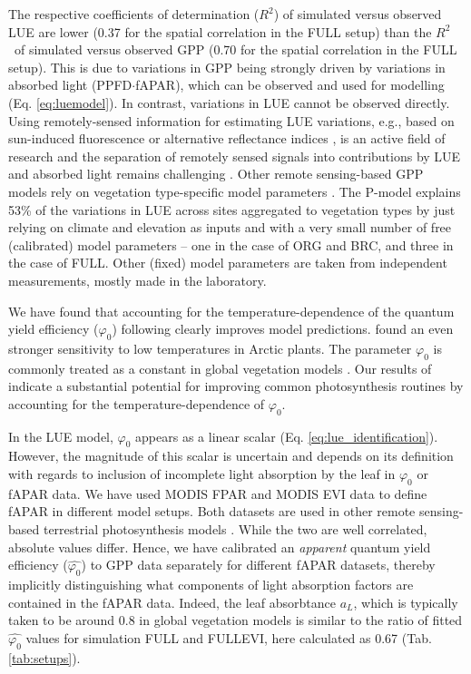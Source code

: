 \documentclass{myreport}
\newcommand{\rsq}{$R^2$}
\begin{document}
The respective coefficients of determination (\rsq ) of simulated versus observed LUE are lower (0.37 for the spatial correlation in the FULL setup) than the \rsq\ of simulated versus observed GPP (0.70 for the spatial correlation in the FULL setup). This is due to variations in GPP being strongly driven by variations in absorbed light (PPFD$\cdot$fAPAR), which can be observed and used for modelling (Eq. \ref{eq:luemodel}). In contrast, variations in LUE cannot be observed directly. Using remotely-sensed information for estimating LUE variations, e.g., based on sun-induced fluorescence \citep{frankenberg18, li18gcb, ryu19rse} or alternative reflectance indices \citep{gamon92, gamon16pnas, Badgley2017-tw}, is an active field of research and the separation of remotely sensed signals into contributions by LUE and absorbed light remains challenging \citep{porcarcastell14, ryu19rse}. Other remote sensing-based GPP models rely on vegetation type-specific model parameters \citep{Zhang2017-yr, running04, jiang16rse}. The P-model explains 53\% of the variations in LUE across sites aggregated to vegetation types by just relying on climate and elevation as inputs and with a very small number of free (calibrated) model parameters -- one in the case of ORG and BRC, and three in the case of FULL. Other (fixed) model parameters are taken from independent measurements, mostly made in the laboratory. %

We have found that accounting for the temperature-dependence of the quantum yield efficiency ($\varphi_0$) following \cite{bernacchi03pce} clearly improves model predictions. \cite{rogers19newphyt} found an even stronger sensitivity to low temperatures in Arctic plants. The parameter $\varphi_0$ is commonly treated as a constant in global vegetation models \citep{rogers17}. Our results of indicate a substantial potential for improving common photosynthesis routines by accounting for the temperature-dependence of $\varphi_0$. 

In the LUE model, $\varphi_0$ appears as a linear scalar  (Eq. \ref{eq:lue_identification}). However, the magnitude of this scalar is uncertain and depends on its definition with regards to inclusion of incomplete light absorption by the leaf in $\varphi_0$ or fAPAR data. We have used MODIS FPAR and MODIS EVI data to define fAPAR in different model setups. Both datasets are used in other remote sensing-based terrestrial photosynthesis models \citep{Zhang2017-yr, jiang16rse}. While the two are well correlated, absolute values differ. Hence, we have calibrated an \textit{apparent} quantum yield efficiency ($\widehat{\varphi_0}$) to GPP data separately for different fAPAR datasets, thereby implicitly distinguishing what components of light absorption factors are contained in the fAPAR data. Indeed, the leaf absorbtance $a_L$, which is typically taken to be around 0.8 in global vegetation models \citep{rogers17} is similar to the ratio of fitted $\widehat{\varphi_0}$ values for simulation FULL and FULL\textunderscore EVI, here calculated as 0.67 (Tab. \ref{tab:setups}).
\end{document}
